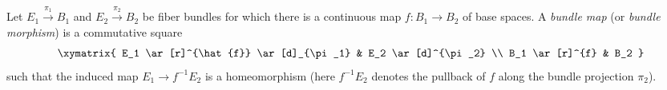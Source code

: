 \documentclass[12pt]{article}
\begin{document}
Let $E_1 \overset{\pi_1}\to B_1$ and $E_2 \overset{\pi_2}\to B_2$ be fiber bundles for which there is a continuous map $f:B_1 \to B_2$ of base spaces. A \emph{bundle map} (or \emph{bundle morphism}) is  a commutative square
$$
\xymatrix{
E_1 \ar[r]^{\hat{f}} \ar[d]_{\pi_1} & E_2 \ar[d]^{\pi_2} \\
B_1 \ar[r]^{f} & B_2
}
$$
such that the induced map $E_1 \to f^{-1}E_2$ is a homeomorphism (here $f^{-1}E_2$ denotes the pullback of $f$ along the bundle projection $\pi_2$).
\end{document}
